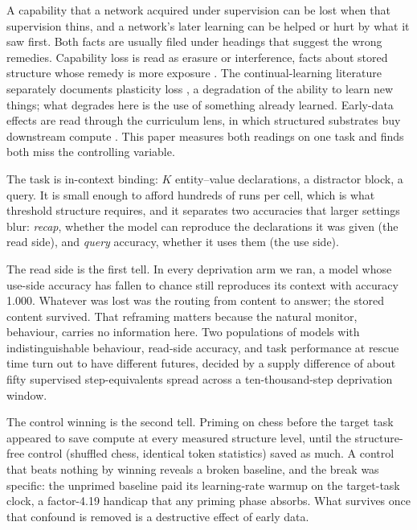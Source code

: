 \documentclass{article}
\begin{document}
A capability that a network acquired under supervision can be lost when that supervision
thins, and a network's later learning can be helped or hurt by what it saw first. Both facts
are usually filed under headings that suggest the wrong remedies. Capability loss is read as
erasure or interference, facts about stored structure whose remedy is more exposure
\cite{mccloskey1989, french1999, kirkpatrick2017}. The continual-learning literature
separately documents plasticity loss \cite{dohare2023, lyle2023}, a degradation of the
ability to learn new things; what degrades here is the use of something already learned.
Early-data effects are read through the
curriculum lens, in which structured substrates buy downstream compute
\cite{bengio2009, papadimitriou2020, wu2021}. This paper measures both readings on one task
and finds both miss the controlling variable.

The task is in-context binding: $K$ entity--value declarations, a distractor block, a query.
It is small enough to afford hundreds of runs per cell, which is what threshold structure
requires, and it separates two accuracies that larger settings blur: \emph{recap}, whether
the model can reproduce the declarations it was given (the read side), and \emph{query}
accuracy, whether it uses them (the use side).

The read side is the first tell. In every deprivation arm we ran, a model whose use-side
accuracy has fallen to chance still reproduces its context with accuracy 1.000. Whatever was
lost was the routing from content to answer; the stored content survived. That reframing
matters because the natural monitor, behaviour, carries no information here. Two populations
of models with indistinguishable behaviour, read-side accuracy, and task
performance at rescue time turn out to have different futures, decided by a supply
difference of about
fifty supervised step-equivalents spread across a ten-thousand-step deprivation window.

The control winning is the second tell. Priming on chess before the target task appeared to
save compute at every measured structure level, until the
structure-free control (shuffled chess, identical token statistics) saved as much. A control
that beats nothing by winning reveals a broken baseline, and the break was specific: the
unprimed baseline paid its learning-rate warmup \cite{goyal2017} on the target-task clock,
a factor-4.19 handicap that any priming phase absorbs. What survives once that confound is
removed is a destructive effect of early data.
\end{document}
